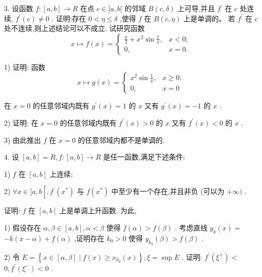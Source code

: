 3. 设函数 $f : \left\lbrack  {a,b}\right\rbrack   \rightarrow  R$ 在点 $c \in  \rbrack a,b\lbrack$ 的邻域 $B\left( {c,\delta }\right)$ 上可导,并且 ${f}^{\prime }$ 在 $c$ 处连续, ${f}^{\prime }\left( c\right)  \neq  0$ . 证明:存在 $0 < \eta  \leq  \delta$ ,使得 $f$ 在 $B\left( {c,\eta }\right)$ 上是单调的。 若 ${f}^{\prime }$ 在 $c$ 处不连续,则上述结论可以不成立. 试研究函数
$$x \mapsto  f\left( x\right)  = \left\{  \begin{array}{ll} \frac{x}{2} + {x}^{2}\sin \frac{1}{x}, & x < 0; \\  0, & x = 0. \end{array}\right.$$

1) 证明: 函数
$$x \mapsto  g\left( x\right)  = \left\{  \begin{array}{ll} {x}^{2}\sin \frac{1}{x}, & x \geq  0; \\  0, & x = 0 \end{array}\right.$$

在 $x = 0$ 的任意邻域内既有 ${g}^{\prime }\left( x\right)  = 1$ 的 $x$ 又有 ${g}^{\prime }\left( x\right)  =  - 1$ 的 $x$ .

2) 证明: 在 $x = 0$ 的任意邻域内既有 ${f}^{\prime }\left( x\right)  > 0$ 的 $x$ 又有 ${f}^{\prime }\left( x\right)  < 0$ 的 $x$ .

3) 由此推出 $f$ 在 $x = 0$ 的任意邻域内都不是单调的.

4. 设 $\left\lbrack  {a,b}\right\rbrack   = R,f : \left\lbrack  {a,b}\right\rbrack   \rightarrow  R$ 是任一函数,满足下述条件:

1) $f$ 在 $\left\lbrack  {a,b}\right\rbrack$ 上连续;

2) $\forall x \in  \rbrack a,b\left\lbrack  \right. ,{f}^{\prime }\left( {x}^{ * }\right)$ 与 $f\left( {x}^{ * }\right)$ 中至少有一个存在,并且非负 (可以为 $+ \infty )$ .

证明: $f$ 在 $\left\lbrack  {a,b}\right\rbrack$ 上是单调上升函数. 为此,

1) 假设存在 $\alpha ,\beta  \in  \left\lbrack  {a,b}\right\rbrack  ,\alpha  < \beta$ 使得 $f\left( \alpha \right)  > f\left( \beta \right)$ . 考虑直线 ${y}_{k}\left( x\right)  =$  $- k\left( {x - \alpha }\right)  + f\left( \alpha \right)$ ,证明存在 ${k}_{0} > 0$ 使得 ${y}_{{k}_{0}}\left( \beta \right)  > f\left( \beta \right)$ .

2) 令 $E = \left\{  {x \in  \left\lbrack  {\alpha ,\beta }\right\rbrack   \mid  f\left( x\right)  \geq  {x}_{{k}_{0}}\left( x\right) }\right\}  ,\xi  = \sup E$ . 证明: ${f}^{\prime }\left( {\xi }^{ + }\right)  <$  $0,{f}^{\prime }\left( {\xi }^{ - }\right)  < 0$ .

